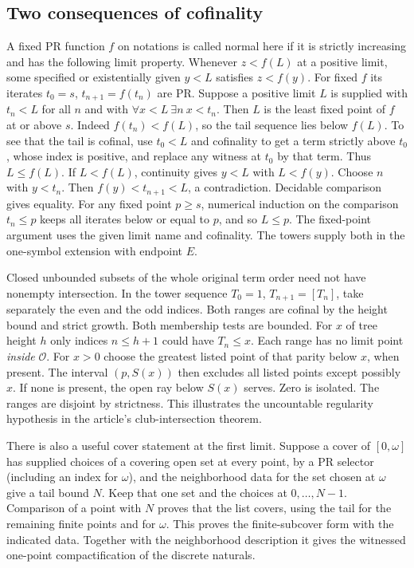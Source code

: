\subsection{Two consequences of cofinality}
A fixed PR function $f$ on notations is called normal here if it is strictly increasing and has the following limit property. Whenever $z<f(L)$ at a positive limit, some specified or existentially given $y<L$ satisfies $z<f(y)$. For fixed $f$ its iterates $t_0=s$, $t_{n+1}=f(t_n)$ are PR. Suppose a positive limit $L$ is supplied with $t_n<L$ for all $n$ and with $\forall x<L\ \exists n\ x<t_n$. Then $L$ is the least fixed point of $f$ at or above $s$. Indeed $f(t_n)<f(L)$, so the tail sequence lies below $f(L)$. To see that the tail is cofinal, use $t_0<L$ and cofinality to get a term strictly above $t_0$, whose index is positive, and replace any witness at $t_0$ by that term. Thus $L\le f(L)$. If $L<f(L)$, continuity gives $y<L$ with $L<f(y)$. Choose $n$ with $y<t_n$. Then $f(y)<t_{n+1}<L$, a contradiction. Decidable comparison gives equality. For any fixed point $p\ge s$, numerical induction on the comparison $t_n\le p$ keeps all iterates below or equal to $p$, and so $L\le p$. The fixed-point argument uses the given limit name and cofinality. The towers supply both in the one-symbol extension with endpoint $E$.

Closed unbounded subsets of the whole original term order need not have nonempty intersection. In the tower sequence $T_0=1$, $T_{n+1}=[T_n]$, take separately the even and the odd indices. Both ranges are cofinal by the height bound and strict growth. Both membership tests are bounded. For $x$ of tree height $h$ only indices $n\le h+1$ could have $T_n\le x$. Each range has no limit point \emph{inside} $\mathcal O$. For $x>0$ choose the greatest listed point of that parity below $x$, when present. The interval $(p,S(x))$ then excludes all listed points except possibly $x$. If none is present, the open ray below $S(x)$ serves. Zero is isolated. The ranges are disjoint by strictness. This illustrates the uncountable regularity hypothesis in the article's club-intersection theorem.

There is also a useful cover statement at the first limit. Suppose a cover of $[0,\omega]$ has supplied choices of a covering open set at every point, by a PR selector (including an index for $\omega$), and the neighborhood data for the set chosen at $\omega$ give a tail bound $N$. Keep that one set and the choices at $0,\ldots,N-1$. Comparison of a point with $N$ proves that the list covers, using the tail for the remaining finite points and for $\omega$. This proves the finite-subcover form with the indicated data. Together with the neighborhood description it gives the witnessed one-point compactification of the discrete naturals.

